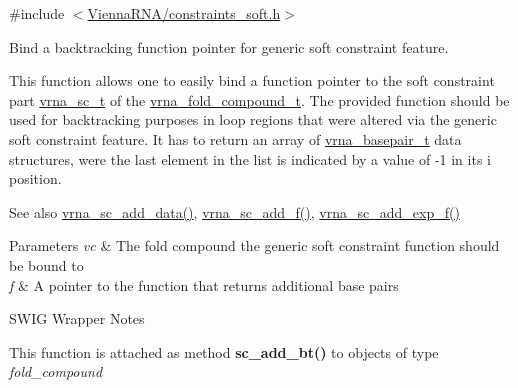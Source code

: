 {\ttfamily \#include $<$\mbox{\hyperlink{constraints__soft_8h}{Vienna\+R\+N\+A/constraints\+\_\+soft.\+h}}$>$}



Bind a backtracking function pointer for generic soft constraint feature. 

This function allows one to easily bind a function pointer to the soft constraint part \mbox{\hyperlink{group__soft__constraints_ga75401ce219ef8dbcceb672db82d434c6}{vrna\+\_\+sc\+\_\+t}} of the \mbox{\hyperlink{group__fold__compound_ga1b0cef17fd40466cef5968eaeeff6166}{vrna\+\_\+fold\+\_\+compound\+\_\+t}}. The provided function should be used for backtracking purposes in loop regions that were altered via the generic soft constraint feature. It has to return an array of \mbox{\hyperlink{group__data__structures_gac8c5669d3fb813cacf506489689305ce}{vrna\+\_\+basepair\+\_\+t}} data structures, were the last element in the list is indicated by a value of -\/1 in it\textquotesingle{}s i position.

\begin{DoxySeeAlso}{See also}
\mbox{\hyperlink{group__soft__constraints_ga15c6d52471ec97897e2bb7f964f5deb6}{vrna\+\_\+sc\+\_\+add\+\_\+data()}}, \mbox{\hyperlink{group__soft__constraints_ga8c7d907ec0125cd61c04e0908010a4e9}{vrna\+\_\+sc\+\_\+add\+\_\+f()}}, \mbox{\hyperlink{group__soft__constraints_ga87e382b5d0c9b7d9ce1b79c0473ff700}{vrna\+\_\+sc\+\_\+add\+\_\+exp\+\_\+f()}}
\end{DoxySeeAlso}

\begin{DoxyParams}{Parameters}
{\em vc} & The fold compound the generic soft constraint function should be bound to \\
\hline
{\em f} & A pointer to the function that returns additional base pairs\\
\hline
\end{DoxyParams}
\begin{DoxyRefDesc}{S\+W\+I\+G Wrapper Notes}
\item[\mbox{\hyperlink{wrappers__wrappers000023}{S\+W\+I\+G Wrapper Notes}}]This function is attached as method {\bfseries sc\+\_\+add\+\_\+bt()} to objects of type {\itshape fold\+\_\+compound} \end{DoxyRefDesc}
\mbox{\label{group__soft__constraints_ga87e382b5d0c9b7d9ce1b79c0473ff700}} 
